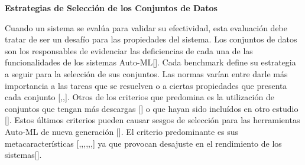 \begin{flushleft} 
    {\large { \textbf{Estrategias de Selección de los Conjuntos de Datos}}}\label{subsection:sel_conj Auto-ML}
\end{flushleft}


Cuando un sistema se evalúa para validar su efectividad, esta evaluación debe tratar de ser un desafío para las propiedades del sistema. 
Los conjuntos de datos son los responsables de evidenciar las deficiencias de cada una de las funcionalidades de los sistemas Auto-ML[\cite{15}].
Cada benchmark define su estrategia a seguir para la selección de sus conjuntos.
Las normas varían entre darle más importancia a las tareas que se resuelven o a ciertas propiedades que presenta cada conjunto [\cite{18},\cite{26},\cite{32}]. 
Otros de los criterios que predomina es la utilización de conjuntos que tengan más descargas [\cite{19}] o que hayan sido incluídos en otro estudio [\cite{9}]. 
Estos últimos criterios pueden causar sesgos de selección para las herramientas Auto-ML de nueva generación [\cite{15}].
El criterio predominante es sus metacaracterísticas [\cite{10},\cite{11},\cite{15},\cite{16},\cite{17},\cite{27},\cite{28}] ya que provocan desajuste en el 
rendimiento de los sistemas[\cite{10}].

